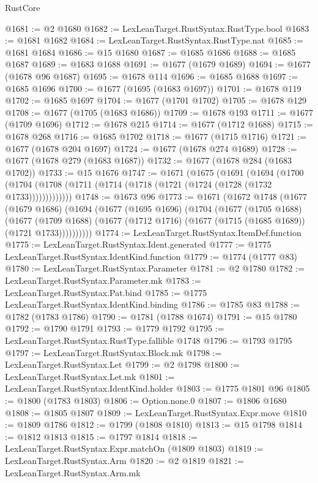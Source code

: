 \begin{lexlean}{RustCore}
\begin{coremodule}
@1681 := @2 @1680
@1682 := LexLeanTarget.RustSyntax.RustType.bool
@1683 := @1681 @1682
@1684 := LexLeanTarget.RustSyntax.RustType.nat
@1685 := @1681 @1684
@1686 := @15 @1680
@1687 := @1685 @1686
@1688 := @1685 @1687
@1689 := @1683 @1688
@1691 := @1677 (@1679 @1689)
@1694 := @1677 (@1678 @96 @1687)
@1695 := @1678 @114
@1696 := @1685 @1688
@1697 := @1685 @1696
@1700 := @1677 (@1695 (@1683 @1697))
@1701 := @1678 @119
@1702 := @1685 @1697
@1704 := @1677 (@1701 @1702)
@1705 := @1678 @129
@1708 := @1677 (@1705 (@1683 @1686))
@1709 := @1678 @193
@1711 := @1677 (@1709 @1696)
@1712 := @1678 @215
@1714 := @1677 (@1712 @1688)
@1715 := @1678 @268
@1716 := @1685 @1702
@1718 := @1677 (@1715 @1716)
@1721 := @1677 (@1678 @204 @1697)
@1724 := @1677 (@1678 @274 @1689)
@1728 := @1677 (@1678 @279 (@1683 @1687))
@1732 := @1677 (@1678 @284 (@1683 @1702))
@1733 := @15 @1676
@1747 := @1671
    (@1675
      (@1691
        (@1694
          (@1700 (@1704 (@1708 (@1711 (@1714 (@1718 (@1721 (@1724 (@1728 (@1732 @1733)))))))))))))
@1748 := @1673 @96
@1773 := @1671
    (@1672
      @1748
      (@1677
        (@1679 @1686)
        (@1694
          (@1677
            (@1695 @1696)
            (@1704
              (@1677
                (@1705 @1688)
                (@1677
                  (@1709 @1688)
                  (@1677 (@1712 @1716) (@1677 (@1715 (@1685 @1689)) (@1721 @1733))))))))))
@1774 := LexLeanTarget.RustSyntax.ItemDef.function
@1775 := LexLeanTarget.RustSyntax.Ident.generated
@1777 := @1775 LexLeanTarget.RustSyntax.IdentKind.function
@1779 := @1774 (@1777 @83)
@1780 := LexLeanTarget.RustSyntax.Parameter
@1781 := @2 @1780
@1782 := LexLeanTarget.RustSyntax.Parameter.mk
@1783 := LexLeanTarget.RustSyntax.Pat.bind
@1785 := @1775 LexLeanTarget.RustSyntax.IdentKind.binding
@1786 := @1785 @83
@1788 := @1782 (@1783 @1786)
@1790 := @1781 (@1788 @1674)
@1791 := @15 @1780
@1792 := @1790 @1791
@1793 := @1779 @1792
@1795 := LexLeanTarget.RustSyntax.RustType.fallible @1748
@1796 := @1793 @1795
@1797 := LexLeanTarget.RustSyntax.Block.mk
@1798 := LexLeanTarget.RustSyntax.Let
@1799 := @2 @1798
@1800 := LexLeanTarget.RustSyntax.Let.mk
@1801 := LexLeanTarget.RustSyntax.IdentKind.holder
@1803 := @1775 @1801 @96
@1805 := @1800 (@1783 @1803)
@1806 := Option.none.{0}
@1807 := @1806 @1680
@1808 := @1805 @1807
@1809 := LexLeanTarget.RustSyntax.Expr.move
@1810 := @1809 @1786
@1812 := @1799 (@1808 @1810)
@1813 := @15 @1798
@1814 := @1812 @1813
@1815 := @1797 @1814
@1818 := LexLeanTarget.RustSyntax.Expr.matchOn (@1809 @1803)
@1819 := LexLeanTarget.RustSyntax.Arm
@1820 := @2 @1819
@1821 := LexLeanTarget.RustSyntax.Arm.mk

\end{coremodule}
\end{lexlean}
